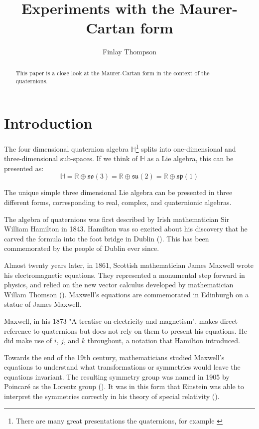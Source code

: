 \documentclass{amsart}
\title{Experiments with the Maurer-Cartan form}
\author{Finlay Thompson}
\newcommand{\HH}{\mathbb{H}}
\newcommand{\RR}{\mathbb{R}}
\newcommand{\so}{\mathfrak{so}}
\newcommand{\su}{\mathfrak{su}}
\renewcommand{\sp}{\mathfrak{sp}}
\begin{document}
\begin{abstract}
  This paper is a close look at the Maurer-Cartan form in the context of the quaternions.
\end{abstract}

\maketitle

\section{Introduction}

The four dimensional quaternion algebra $\HH$\footnote{There are many great presentations the quaternions, for example \cite{quaternion_text,quaternion_web,quaternion_video}} splits into one-dimensional and three-dimensional sub-spaces.
If we think of $\HH$ as a Lie algebra, this can be presented as:
$$\HH = \RR \oplus \so(3) = \RR \oplus \su(2) = \RR \oplus \sp(1) $$

The unique simple three dimensional Lie algebra can be presented in three different forms, corresponding to real, complex, and quaternionic algebras.

The algebra of quaternions was first described by Irish mathematician Sir William Hamilton in 1843.
Hamilton was so excited about his discovery that he carved the formula into the foot bridge in Dublin (\cite{footbridge}).
This has been commemorated by the people of Dublin ever since.

Almost twenty years later, in 1861, Scottish mathematician James Maxwell wrote his electromagnetic equations.
They represented a monumental step forward in physics, and relied on the new vector calculus developed by mathematician Willam Thomson (\cite{maxwell_electromagenetism}).
Maxwell's equations are commemorated in Edinburgh on a statue of James Maxwell.

Maxwell, in his 1873 "A treatise on electricity and magnetism", makes direct reference to quaternions but does not rely on them to present his equations.
He did make use of $i$, $j$, and $k$ throughout, a notation that Hamilton introduced.

Towards the end of the 19th century, mathematicians studied Maxwell's equations to understand what transformations or symmetries would leave the equations invariant.
The resulting symmetry group was named in 1905 by Poincaré as the Lorentz group (\cite{poincare_lorentz}).
It was in this form that Einstein was able to interpret the symmetries correctly in his theory of special relativity (\cite{einstein_special_relativity}).
\end{document}
